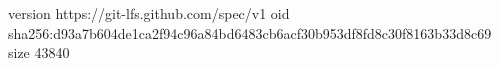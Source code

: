 version https://git-lfs.github.com/spec/v1
oid sha256:d93a7b604de1ca2f94c96a84bd6483cb6acf30b953df8fd8c30f8163b33d8c69
size 43840
